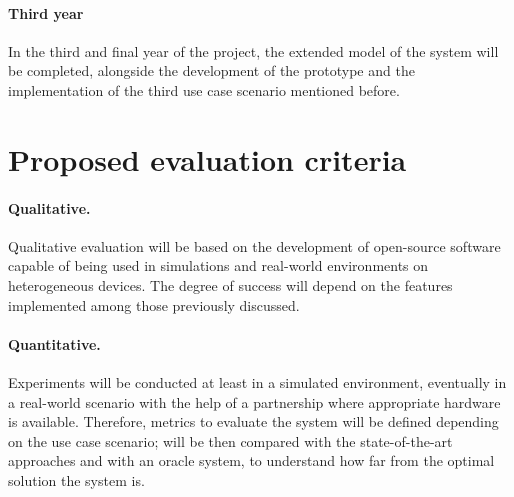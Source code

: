 \documentclass[12pt, a4paper]{article}
\begin{document}
\sloppypar
\paragraph{Third year}
In the third and final year of the project,
the extended model of the system will be completed, alongside the development of the prototype
and the implementation of the third use case scenario mentioned before.

\section{Proposed evaluation criteria}
\label{sec:proposed-evaluation-criteria}

\sloppypar
\paragraph{Qualitative.}
Qualitative evaluation will be based on the development of open-source software capable of being used in simulations and real-world
environments on heterogeneous devices.
%
The degree of success will depend on the features implemented among those previously discussed.

\sloppypar
\paragraph{Quantitative.}
Experiments will be conducted at least in a simulated environment,
eventually in a real-world scenario with the help of a partnership where appropriate hardware is available.
%
Therefore,
metrics to evaluate the system will be defined depending on the use case scenario;
will be then compared with the state-of-the-art approaches and with an oracle system,
to understand how far from the optimal solution the system is.
\end{document}
